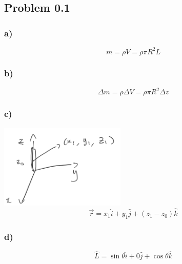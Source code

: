 \documentclass[../homework.tex]{subfiles}
\begin{document}
\subsection{Problem 0.1}
\subsubsection*{a)}
\begin{equation*}
    m = \rho V = \rho \pi R^2 L
\end{equation*}
\subsubsection*{b)}
\begin{equation*}
    \Delta m = \rho \Delta V = \rho \pi R^2 \Delta z
\end{equation*}
\subsubsection*{c)}
\includegraphics[width=6cm]{sketch.png}
\begin{equation*}
    \vec{r} = x_1\hat{i} + y_1\hat{j} + (z_1 - z_0)\hat{k}
\end{equation*}
\subsubsection*{d)}
\begin{equation*}
    \hat{L} = \sin{\theta}\hat{i} + 0\hat{j} + \cos{\theta}\hat{k}
\end{equation*}
\end{document}
